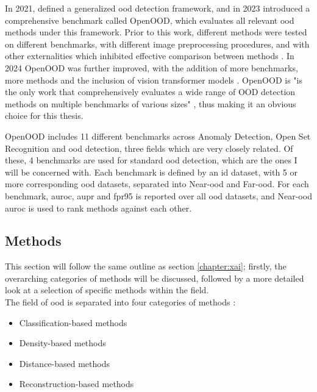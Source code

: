 \documentclass[UKenglish]{uiomasterthesis} %
\theoremstyle{definition}
\begin{document}
In 2021, \cite{oodoverview} defined a generalized \ac{ood} detection framework, and in 2023 \cite{openood} introduced a comprehensive benchmark called OpenOOD, which evaluates all relevant \ac{ood} methods under this framework. Prior to this work, different methods were tested on different benchmarks, with different image preprocessing procedures, and with other externalities which inhibited effective comparison between methods \cite{openood}. In 2024 OpenOOD was further improved, with the addition of more benchmarks, more methods and the inclusion of vision transformer models \cite{openood15}. OpenOOD is "is the only work that comprehensively evaluates a wide range of OOD detection methods on multiple benchmarks of various sizes" \cite{openood15}, thus making it an obvious choice for this thesis.

OpenOOD includes 11 different benchmarks across Anomaly Detection, Open Set Recognition and \ac{ood} detection, three fields which are very closely related. Of these, 4 benchmarks are used for standard \ac{ood} detection, which are the ones I will be concerned with. Each benchmark is defined by an \ac{id} dataset, with 5 or more corresponding \ac{ood} datasets, separated into Near-\ac{ood} and Far-\ac{ood}. For each benchmark, \ac{auroc}, \ac{aupr} and \ac{fpr95} is reported over all \ac{ood} datasets, and Near-\ac{ood} \ac{auroc} is used to rank methods against each other.

\subsection{Methods}

This section will follow the same outline as section \ref{chapter:xai}; firstly, the overarching categories of methods will be discussed, followed by a more detailed look at a selection of specific methods within the field.
\\

The field of \ac{ood} is separated into four categories of methods \cite{oodoverview}:

\begin{itemize}
  \item Classification-based methods
  \item Density-based methods
  \item Distance-based methods
  \item Reconstruction-based methods
\end{itemize}
\end{document}
